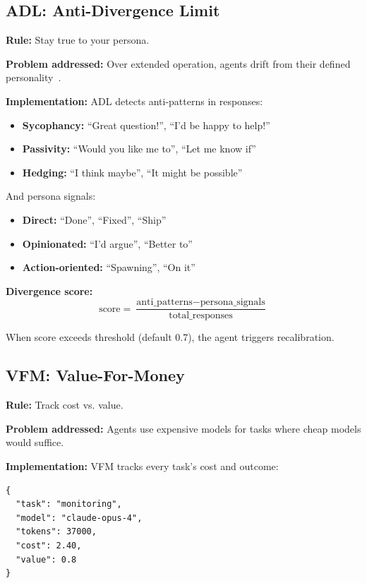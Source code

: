 \documentclass{article}
\begin{document}
\subsection{ADL: Anti-Divergence Limit}

\textbf{Rule:} Stay true to your persona.

\textbf{Problem addressed:} Over extended operation, agents drift from their defined personality~\cite{park2023generative, sharma2023sycophancy}.

\textbf{Implementation:} ADL detects anti-patterns in responses:

\begin{itemize}[leftmargin=*]
    \item \textbf{Sycophancy:} ``Great question!'', ``I'd be happy to help!''
    \item \textbf{Passivity:} ``Would you like me to'', ``Let me know if''
    \item \textbf{Hedging:} ``I think maybe'', ``It might be possible''
\end{itemize}

And persona signals:
\begin{itemize}[leftmargin=*]
    \item \textbf{Direct:} ``Done'', ``Fixed'', ``Ship''
    \item \textbf{Opinionated:} ``I'd argue'', ``Better to''
    \item \textbf{Action-oriented:} ``Spawning'', ``On it''
\end{itemize}

\textbf{Divergence score:}
\begin{equation}
\text{score} = \frac{\text{anti\_patterns} - \text{persona\_signals}}{\text{total\_responses}}
\end{equation}

When score exceeds threshold (default 0.7), the agent triggers recalibration.

\subsection{VFM: Value-For-Money}

\textbf{Rule:} Track cost vs. value.

\textbf{Problem addressed:} Agents use expensive models for tasks where cheap models would suffice.

\textbf{Implementation:} VFM tracks every task's cost and outcome:

\begin{lstlisting}[style=jsoncode]
{
  "task": "monitoring",
  "model": "claude-opus-4",
  "tokens": 37000,
  "cost": 2.40,
  "value": 0.8
}
\end{lstlisting}
\end{document}
